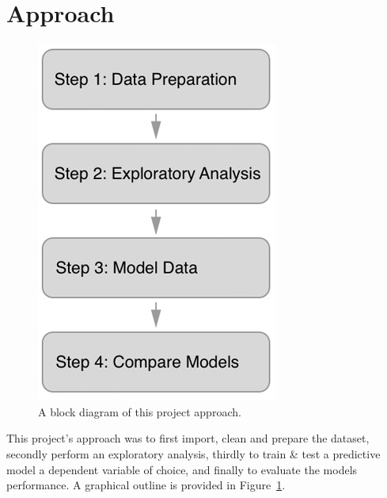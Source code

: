 \documentclass[12pt,letterpaper, oneside]
{article}
\begin{document}
\section{Approach}
\begin{figure}
	\centering
	\includegraphics[width=\textwidth]{block-diagram}
	\caption{
		A block diagram of this project approach.
		\label{fig:blocks}
	}
\end{figure}

This project's approach was to first import, clean and prepare the dataset, secondly perform an exploratory analysis, thirdly to train \& test a predictive model a dependent variable of choice, and finally to evaluate the models performance. A graphical outline is provided in Figure~\ref{fig:blocks}.
\end{document}
